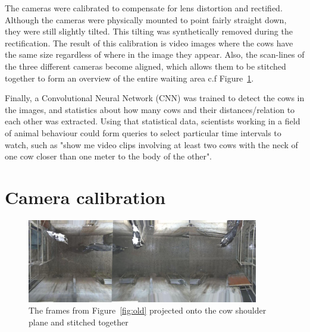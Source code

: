 \documentclass{cta-author}
\begin{document}
The cameras were calibrated to compensate for lens distortion and rectified. Although the cameras were physically mounted to point fairly straight down, they were still slightly tilted. This tilting was synthetically removed during the rectification. The result of this calibration is video images where the cows have the same size regardless of where in the image they appear. Also, the scan-lines of the three different cameras become aligned, which allows them to be stitched together to form an overview of the entire waiting area c.f Figure~\ref{fig:stitch}.

Finally, a Convolutional Neural Network (CNN)  was trained to detect the cows in the images, and statistics about how many cows and their distances/relation to each other was extracted. Using that statistical data, scientists working in a field of animal behaviour could form queries to select particular time intervals to watch, such as "show me video clips involving at least two cows with the neck of one cow closer than one meter to the body of the other".


\section{Camera calibration}

\begin{figure}[t]
\begin{center}
  \includegraphics[width=0.9\textwidth]{full.jpg}
\end{center}
  \caption{The frames from Figure~\ref{fig:old} projected onto the cow shoulder plane and stitched together}
  \label{fig:stitch}
\end{figure}
\end{document}
